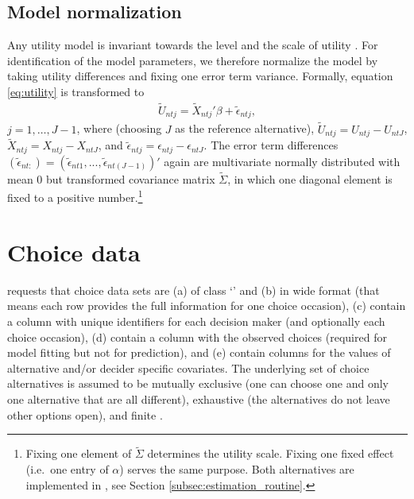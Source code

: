 \documentclass[article]{jss}
\newcommand{\class}[1]{`\code{#1}'}
\begin{document}
\subsection{Model normalization} \label{subsec:normalization}

Any utility model is invariant towards the level and the scale of utility \citep[Ch.\ 2]{Train:2009}. For identification of the model parameters, we therefore normalize the model by taking utility differences and fixing one error term variance. Formally, equation \eqref{eq:utility} is transformed to
\begin{align*}
\tilde{U}_{ntj} = \tilde{X}_{ntj}' \beta + \tilde{\epsilon}_{ntj},
\end{align*}
$j=1,\dots,J-1$, where (choosing $J$ as the reference alternative), $\tilde{U}_{ntj} = U_{ntj} - U_{ntJ}$, $\tilde{X}_{ntj} = X_{ntj} - X_{ntJ}$, and $\tilde{\epsilon}_{ntj} = \epsilon_{ntj} - \epsilon_{ntJ}$. The error term differences $(\tilde{\epsilon}_{nt:}) = (\tilde{\epsilon}_{nt1},...,\tilde{\epsilon}_{nt(J-1)})'$ again are multivariate normally distributed with mean 0 but transformed covariance matrix $\tilde{\Sigma}$, in which one diagonal element is fixed to a positive number.\footnote{Fixing one element of $\tilde{\Sigma}$ determines the utility scale. Fixing one fixed effect (i.e.\ one entry of $\alpha$) serves the same purpose. Both alternatives are implemented in , see Section \ref{subsec:estimation_routine}.}

\section{Choice data} \label{sec:choice_data}

 requests that choice data sets are (a) of class \class{data.frame} and (b) in wide format (that means each row provides the full information for one choice occasion), (c) contain a column with unique identifiers for each decision maker (and optionally each choice occasion), (d) contain a column with the observed choices (required for model fitting but not for prediction), and (e) contain columns for the values of alternative and/or decider specific covariates. The underlying set of choice alternatives is assumed to be mutually exclusive (one can choose one and only one alternative that are all different), exhaustive (the alternatives do not leave other options open), and finite \citep[Ch.\ 2]{Train:2009}.
\end{document}
